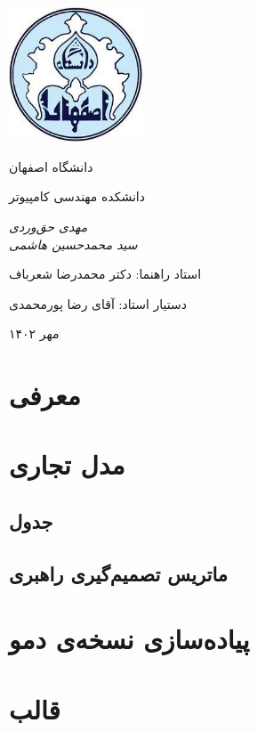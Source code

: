 \documentclass[11pt, oneside]{book}
\begin{document}
\frontmatter
    \begin{titlepage}
        \centering
        \includegraphics[width=4cm, height=4cm]{./images/logo}\par
        \vspace{2mm}            دانشگاه اصفهان \par
            دانشکده مهندسی کامپیوتر \par
        
        \vspace{1cm}
        {\huge {}\par}
        \vspace{3cm}
        {\small\itshape                مهدی حق‌وردی\\
                سید محمدحسین هاشمی \par}
        
        \vfill \par	\vfill
        
        \vfill            استاد راهنما:‌ دکتر محمدرضا شعرباف \par
            دستیار استاد:‌ آقای رضا پورمحمدی
        \vfill
        
        {\large مهر ۱۴۰۲\par}
\end{titlepage}
\tableofcontents
\mainmatter

\chapter{معرفی}
\chapter{مدل تجاری }
\section{جدول }
\section{ماتریس تصمیم‌گیری راهبری}
\chapter{پیاده‌سازی نسخه‌ی دمو}
\chapter{قالب }
\end{document}
